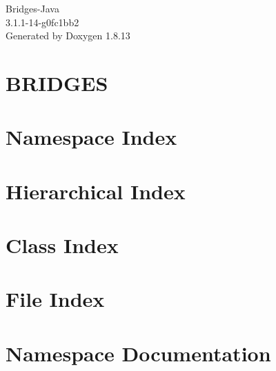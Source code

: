 \documentclass[twoside]{book}
\newcommand{\+}{\discretionary{\mbox{\scriptsize$\hookleftarrow$}}{}{}}
\newcommand{\clearemptydoublepage}{%
  \newpage{\pagestyle{empty}\cleardoublepage}%
}
\begin{document}
\hypersetup{pageanchor=false,
             bookmarksnumbered=true,
             pdfencoding=unicode
            }
\begin{titlepage}
\vspace*{7cm}
\begin{center}%
{\Large Bridges-\/\+Java \\[1ex]\large 3.\+1.\+1-\/14-\/g0fc1bb2 }\\
\vspace*{1cm}
{\large Generated by Doxygen 1.8.13}\\
\end{center}
\end{titlepage}
\clearemptydoublepage
{}
\tableofcontents
\clearemptydoublepage
{}
\hypersetup{pageanchor=true}

\chapter{B\+R\+I\+D\+G\+ES}
\label{index}\hypertarget{index}{}
\chapter{Namespace Index}

\chapter{Hierarchical Index}

\chapter{Class Index}

\chapter{File Index}

\chapter{Namespace Documentation}







\end{document}
